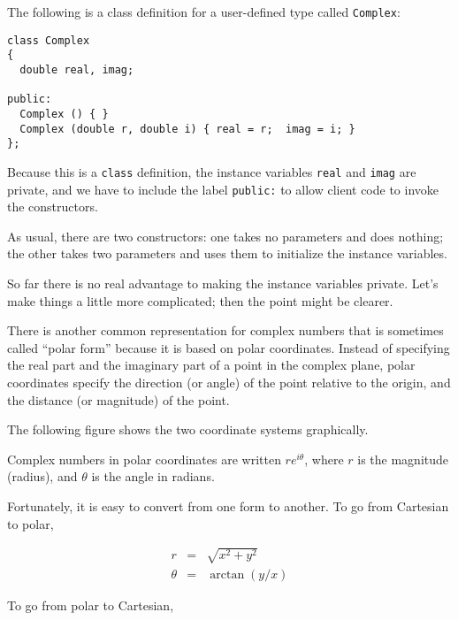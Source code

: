 The following is a class definition for a user-defined type called
{\tt Complex}:

\begin{lstlisting}
class Complex
{
  double real, imag;

public:
  Complex () { }
  Complex (double r, double i) { real = r;  imag = i; }
};
\end{lstlisting}
%
Because this is a {\tt class} definition, the instance variables
{\tt real} and {\tt imag} are private, and we have to include
the label {\tt public:} to allow client code to invoke the
constructors.

As usual, there are two constructors: one takes no parameters and does
nothing; the other takes two parameters and uses them to initialize
the instance variables.


So far there is no real advantage to making the instance
variables private.  Let's make things a little more complicated;
then the point might be clearer.


There is another common representation for complex numbers that is
sometimes called ``polar form'' because it is based on polar
coordinates.  Instead of specifying the real part and the imaginary
part of a point in the complex plane, polar coordinates specify the
direction (or angle) of the point relative to the origin, and
the distance (or magnitude) of the point.  

The following figure shows the two coordinate systems graphically.

\vspace {0.1in}
\centerline{}
\vspace {0.1in}

Complex numbers in polar coordinates are written $r e^{i \theta}$,
where $r$ is the magnitude (radius), and $\theta$ is the angle in
radians.

Fortunately, it is easy to convert from one form to another.
To go from Cartesian to polar,

\begin{eqnarray*}
r       & = &  \sqrt{x^2 + y^2} \\
\theta  & = &  \arctan (y / x)
\end{eqnarray*}

To go from polar to Cartesian,

